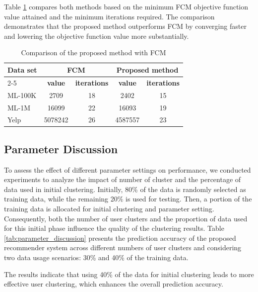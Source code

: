 \documentclass{article}
\theoremstyle{plain}
\theoremstyle{definition}
\theoremstyle{remark}
\begin{document}
Table \ref{tab:cmpFCM} compares both methods based on the minimum FCM objective function value attained and the minimum iterations required. The comparison demonstrates that the proposed method outperforms FCM by converging faster and lowering the objective function value more substantially.

\begin{table}[htbp]
\centering
\caption{Comparison of the proposed method with FCM}
\label{tab:cmpFCM}
\renewcommand{\arraystretch}{1.3}
\setlength{\tabcolsep}{8pt}
\begin{tabular}{lcccc}
\hline
\textbf{Data set} & \multicolumn{2}{c}{\textbf{FCM}} & \multicolumn{2}{c}{\textbf{Proposed method}} \\
\cline{2-5}
& \textbf{value} & \textbf{iterations} & \textbf{value} & \textbf{iterations} \\
\hline
ML-100K & 2709 & 18 & 2402 & 15 \\
ML-1M   & 16099 & 22 & 16093 & 19 \\
Yelp    & 5078242 & 26 & 4587557 & 23 \\
\hline
\end{tabular}
\end{table}



\subsection{Parameter Discussion}
To assess the effect of different parameter settings on performance, we conducted experiments to analyze the impact of number of cluster and the percentage of data used in initial clustering. 
Initially, 80\% of the data is randomly selected as training data, while the remaining 20\% is used for testing.
Then, a portion of the training data is allocated for initial clustering and parameter setting. Consequently, both the number of user clusters and the proportion of data used for this initial phase influence the quality of the clustering results.
Table \ref{tab:parameter_discussion} presents the prediction accuracy of the proposed recommender system across different numbers of user clusters and considering two data usage scenarios: 30\% and 40\% of the training data.

The results indicate that using 40\% of the data for initial clustering leads to more effective user clustering, which enhances the overall prediction accuracy.
\end{document}
